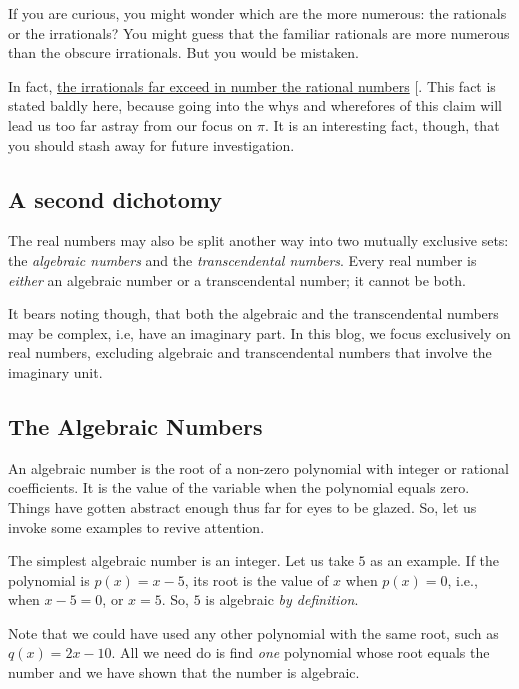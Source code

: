 \documentclass[
  a4paper,
]{article}
\begin{document}
If you are curious, you might wonder which are the more numerous: the
rationals or the irrationals? You might guess that the familiar
rationals are more numerous than the obscure irrationals. But you would
be mistaken.

In fact,
\href{https://socratic.org/questions/58c80a37b72cff29df40c794}{the
irrationals far exceed in number the rational numbers}
{[}\citeproc{ref-socratic}{7}{]}. This fact is stated baldly here,
because going into the whys and wherefores of this claim will lead us
too far astray from our focus on \(\pi\). It is an interesting fact,
though, that you should stash away for future investigation.

\subsection{A second dichotomy}\label{a-second-dichotomy}

The real numbers may also be split another way into two mutually
exclusive sets: the \emph{algebraic numbers} and the
\emph{transcendental numbers}. Every real number is \emph{either} an
algebraic number or a transcendental number; it cannot be both.

It bears noting though, that both the algebraic and the transcendental
numbers may be complex, i.e, have an imaginary part. In this blog, we
focus exclusively on real numbers, excluding algebraic and
transcendental numbers that involve the imaginary unit.

\subsection{The Algebraic Numbers}\label{the-algebraic-numbers}

An algebraic number is the root of a non-zero polynomial with integer or
rational coefficients. It is the value of the variable when the
polynomial equals zero. Things have gotten abstract enough thus far for
eyes to be glazed. So, let us invoke some examples to revive attention.

The simplest algebraic number is an integer. Let us take \(5\) as an
example. If the polynomial is \(p(x) = x - 5\), its root is the value of
\(x\) when \(p(x) = 0\), i.e., when \(x - 5 = 0\), or \(x = 5\). So,
\(5\) is algebraic \emph{by definition}.

Note that we could have used any other polynomial with the same root,
such as \(q(x) = 2x - 10\). All we need do is find \emph{one} polynomial
whose root equals the number and we have shown that the number is
algebraic.
\end{document}
